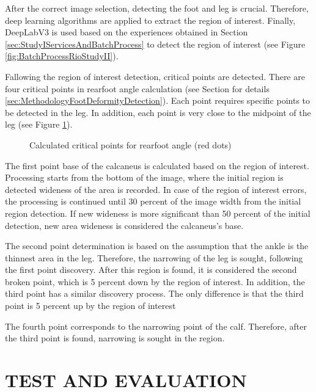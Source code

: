 After the correct image selection, detecting the foot and leg is crucial. Therefore, deep learning algorithms are applied to extract the region of interest. Finally, DeepLabV3 is used based on the experiences obtained in Section \ref{sec:StudyIServicesAndBatchProcess} to detect the region of interest (see Figure \ref{fig:BatchProcessRioStudyII}).

Fallowing the region of interest detection, critical points are detected. There are four critical points in rearfoot angle calculation (see Section for details \ref{sec:MethodologyFootDeformityDetection}). Each point requires specific points to be detected in the leg. In addition, each point is very close to the midpoint of the leg (see Figure \ref{fig:BatchProcessDotsStudyII}).

\begin{figure}[htbp]
\centering
{}
\caption{Calculated critical points for rearfoot angle (red dots)}
\label{fig:BatchProcessDotsStudyII}
\end{figure}

The first point base of the calcaneus is calculated based on the region of interest. Processing starts from the bottom of the image, where the initial region is detected wideness of the area is recorded. In case of the region of interest errors, the processing is continued until 30 percent of the image width from the initial region detection. If new wideness is more significant than 50 percent of the initial detection, new area wideness is considered the calcaneus's base.

The second point determination is based on the assumption that the ankle is the thinnest area in the leg. Therefore, the narrowing of the leg is sought, following the first point discovery. After this region is found, it is considered the second broken point, which is 5 percent down by the region of interest. In addition, the third point has a similar discovery process. The only difference is that the third point is 5 percent up by the region of interest

The fourth point corresponds to the narrowing point of the calf. Therefore, after the third point is found, narrowing is sought in the region.

\section{TEST AND EVALUATION}\label{sec:StudyIITestAndEvaluation}

